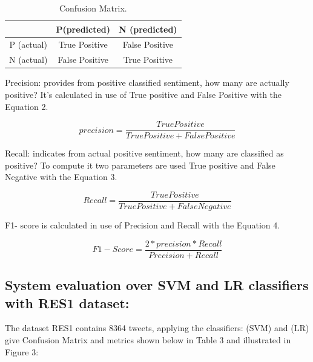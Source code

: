 \documentclass[conference]{IEEEtran}
\begin{document}
\begin{table}[!ht]
	\large        %
	\caption{Confusion Matrix.}\label{label}
	\centering    %
	\begin{tabular}{|c|c|c|}
		\hline
		&P(predicted)&N (predicted)\\     %
		\hline
		P (actual)&True Positive&False Positive\\
		\hline
		N (actual)&False Positive&True Positive\\
		\hline
		
	\end{tabular}
\end{table}


Precision: provides from positive classified sentiment, how many are actually positive? It’s calculated in use of True positive and False Positive with the Equation 2.

\begin{equation}
precision =\frac{True Positive}{True Positive + False Positive}\label{Pr}
\end{equation}

 Recall: indicates from actual positive sentiment, how many are classified as positive? To compute it two parameters are used True positive and False Negative with the Equation 3.
 
 \begin{equation}
 Recall =\frac{True Positive}{True Positive + False Negative}\label{Re}
 \end{equation}
 
 F1- score is calculated in use of Precision and Recall with the Equation 4.
 
 \begin{equation}
 F1-Score =\frac{2*precision*Recall}{Precision + Recall}\label{F1}
 \end{equation}
\subsection{System evaluation over SVM and LR classifiers with RES1 dataset:}\label{AA}
The dataset RES1 contains 8364 tweets,   applying the classifiers: (SVM) and (LR) give Confusion Matrix and metrics shown below in Table 3 and illustrated in Figure 3:
\end{document}
